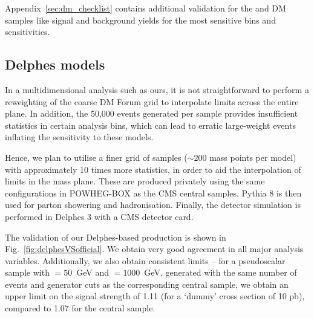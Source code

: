 Appendix~\ref{sec:dm_checklist} contains additional validation for the \DMtt and \DMtt DM samples like signal and background yields for the most sensitive bins and sensitivities.




\subsection{Delphes models}

In a multidimensional analysis such as ours, it is not straightforward to
perform a reweighting of the coarse DM Forum grid to interpolate limits
across the entire plane. In addition, the 50,000 events generated per sample
provides insufficient statistics in certain analysis bins, which can lead to
erratic large-weight events inflating the sensitivity to these models.

Hence, we plan to utilise a finer grid of samples ($\sim200$ mass points per
model) with approximately 10 times more statistics, in order to aid the
interpolation of limits in the mass plane. These are produced privately using the same 
configurations in POWHEG-BOX as the CMS central samples. Pythia 8 is then used
for parton showering and hadronisation. Finally, the detector simulation is 
performed in Delphes 3 with a CMS detector card.

The validation of our Delphes-based production is shown in Fig.~\ref{fig:delphesVSofficial}. We
obtain very good agreement in all major analysis variables. Additionally, we
also obtain consistent limits -- for a pseudoscalar sample with \mchi$=50$~GeV
and \mphi$=1000$~GeV, generated with the same number of events and generator
cuts as the corresponding central sample, we obtain an upper limit on the
signal strength of 1.11 (for a `dummy' cross section of 10 pb), compared to 1.07 
for the central sample.

